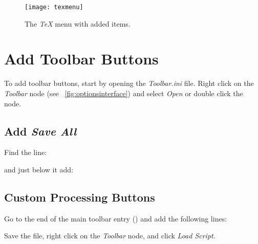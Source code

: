 \begin{figure}
	\centering
	\texttt{[image: texmenu]}
	\caption[The \textit{TeX} menu with added items]{The \textit{TeX} menu with added items.}
	\label{fig:texmenu}
\end{figure}

\section{Add Toolbar Buttons}
To add toolbar buttons, start by opening the \emph{Toolbar.ini} file.  Right click on the \emph{Toolbar} node (see \figurename~\ref{fig:optionsinterface}) and select \emph{Open} or double click the node.

\subsection{Add \textit{Save All}}
Find the line:
\begin{plainlist}
	\item {}
\end{plainlist}

and just below it add:
\begin{plainlist}
	\item {}
\end{plainlist}

\subsection{Custom Processing Buttons}

Go to the end of the main toolbar entry () and add the following lines:
\begin{plainlist}
	\item {}
	\item {}
	\item {}
	\item {}
	\item {}
\end{plainlist}
Save the file, right click on the \emph{Toolbar} node, and click \emph{Load Script}.

